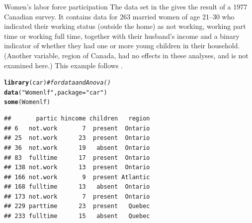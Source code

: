 \documentclass[11pt]{book}\usepackage[]{graphicx}\usepackage[]{color}
\makeatletter
\newcommand{\hlstr}[1]{\textcolor[rgb]{0.192,0.494,0.8}{#1}}%
\newcommand{\hlcom}[1]{\textcolor[rgb]{0.678,0.584,0.686}{\textit{#1}}}%
\newcommand{\hlstd}[1]{\textcolor[rgb]{0.345,0.345,0.345}{#1}}%
\newcommand{\hlkwc}[1]{\textcolor[rgb]{0.333,0.667,0.333}{#1}}%
\newcommand{\hlkwd}[1]{\textcolor[rgb]{0.737,0.353,0.396}{\textbf{#1}}}%
\newenvironment{kframe}{%
 \def\at@end@of@kframe{}%
 \ifinner\ifhmode%
  \def\at@end@of@kframe{\end{minipage}}%
  \begin{minipage}{\columnwidth}%
 \fi\fi%
 \def\FrameCommand##1{\hskip\@totalleftmargin \hskip-\fboxsep
 \colorbox{shadecolor}{##1}\hskip-\fboxsep
     \hskip-\linewidth \hskip-\@totalleftmargin \hskip\columnwidth}%
 \MakeFramed {\advance\hsize-\width
   \@totalleftmargin\z@ \linewidth\hsize
   \@setminipage}}%
 {\par\unskip\endMakeFramed%
 \at@end@of@kframe}
\newenvironment{knitrout}{}{} %
\renewenvironment{knitrout}{\small\renewcommand{\baselinestretch}{.85}}{} %
\makeatother
\begin{document}
\begin{Example}[wlfpart1]{Women's labor force participation}
The data set  in the 
gives the result of a 1977 Canadian survey.  
It contains data for 263 married women of age 21--30 who indicated their 
working status (outside the home)
as not working, working part time or working
full time, together with their husband's income and
a binary indicator of whether they had one or more
young children in their
household.  (Another variable, region of Canada, had no effects in
these analyses, and is not examined here.) This example follows
\citet[\S 5.8]{FoxWeisberg:2011}.

\begin{knitrout}
\color{fgcolor}\begin{kframe}
\begin{alltt}
\hlkwd{library}\hlstd{(car)}   \hlcom{# for data and Anova()}
\hlkwd{data}\hlstd{(}\hlstr{"Womenlf"}\hlstd{,} \hlkwc{package}\hlstd{=}\hlstr{"car"}\hlstd{)}
\hlkwd{some}\hlstd{(Womenlf)}
\end{alltt}
\begin{verbatim}
##       partic hincome children   region
## 6   not.work       7  present  Ontario
## 25  not.work      23  present  Ontario
## 36  not.work      19   absent  Ontario
## 83  fulltime      17  present  Ontario
## 138 not.work      13  present  Ontario
## 166 not.work       9  present Atlantic
## 168 fulltime      13   absent  Ontario
## 173 not.work       7  present  Ontario
## 229 parttime      23  present   Quebec
## 233 fulltime      15   absent   Quebec
\end{verbatim}
\end{kframe}
\end{knitrout}


\end{Example}
\end{document}
